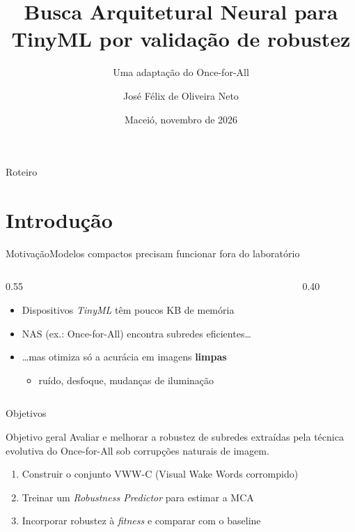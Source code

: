 \documentclass{UFAL-beamer-moderno}
\title[NAS robusta para TinyML]{Busca Arquitetural Neural para TinyML por
validação de robustez}
\subtitle{Uma adaptação do Once-for-All}
\author[José Félix]{José Félix de Oliveira Neto}
\institute[IC/UFAL]{Instituto de Computação --- Universidade Federal de Alagoas}
\date[Nov/2026]{Maceió, novembro de 2026}
\begin{document}
\titlepage

\begin{frame}{Roteiro}
  \tableofcontents[hideallsubsections]
\end{frame}

\section{Introdução}

\begin{frame}{Motivação}{Modelos compactos precisam funcionar fora do laboratório}
  \begin{columns}[T]
    \begin{column}{0.55\textwidth}
      \begin{itemize}
        \setlength{\itemsep}{8pt}
        \item Dispositivos \emph{TinyML} têm poucos KB de memória
        \item NAS (ex.: Once-for-All) encontra subredes eficientes\ldots
        \item \ldots mas otimiza só a acurácia em imagens \textbf{limpas}
          \begin{itemize}
            \item ruído, desfoque, mudanças de iluminação
          \end{itemize}
      \end{itemize}
      \vspace{6pt}
    \end{column}
    \begin{column}{0.40\textwidth}
      \centering
      \vspace{10pt}
    \end{column}
  \end{columns}
\end{frame}

\begin{frame}{Objetivos}
  \begin{block}{Objetivo geral}
    Avaliar e melhorar a robustez de subredes extraídas pela técnica evolutiva do
    Once-for-All sob corrupções naturais de imagem.
  \end{block}
  \vspace{6pt}
  \begin{enumerate}
    \setlength{\itemsep}{6pt}
    \item Construir o conjunto VWW-C (Visual Wake Words corrompido)
    \item Treinar um \textit{Robustness Predictor} para estimar a MCA
    \item Incorporar robustez à \textit{fitness} e comparar com o baseline
  \end{enumerate}
\end{frame}
\end{document}
